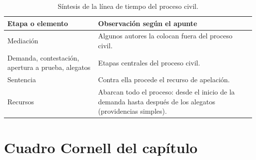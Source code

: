 \documentclass[12pt,oneside]{book}
\begin{document}

\begin{table}[H]
\centering
\begin{tabularx}{\textwidth}{>{\raggedright\arraybackslash}p{}>{\raggedright\arraybackslash}X}
\toprule
\textbf{Etapa o elemento} & \textbf{Observación según el apunte} \\
\midrule
Mediación & Algunos autores la colocan fuera del proceso civil. \\
Demanda, contestación, apertura a prueba, alegatos & Etapas centrales del proceso civil. \\
Sentencia & Contra ella procede el recurso de apelación. \\
Recursos & Abarcan todo el proceso: desde el inicio de la demanda hasta después de los alegatos (providencias simples). \\
\bottomrule
\end{tabularx}
\caption{Síntesis de la línea de tiempo del proceso civil.}
\end{table}

\section{Cuadro Cornell del capítulo}
\end{document}

